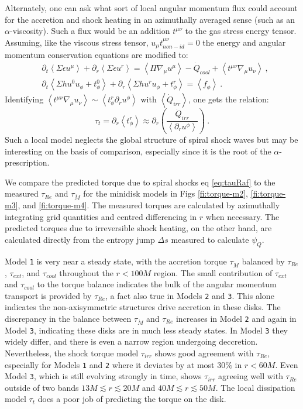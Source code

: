 \documentclass{emulateapj}
\newcommand{\al}{\alpha}
\newcommand{\De}{\Delta}
\newcommand{\eps}{\epsilon}
\newcommand{\Sig}{\Sigma}
\newcommand{\model}[1]{{Model \texttt{#1}}}
\newcommand{\ave}[1]{\left \langle #1 \right \rangle}
\begin{document}
Alternately, one can ask what sort of local angular momentum flux could account for the accretion and shock heating in an azimuthally averaged sense (such as an $\al$-viscosity).  Such a flux would be an addition $t^{\mu\nu}$ to the gas stress energy tensor.  Assuming, like the viscous stress tensor, $u_\mu t^{\mu\nu}_{non-id} = 0$ the energy and angular momentum conservation equations are modified to:
\begin{align}
	&\partial_t \ave{\Sig \eps u^\mu} + \partial_r \ave{\Sig \eps u^r} = \ave{\Pi \nabla_\mu u^\mu} - \dot{Q}_{cool} + \ave{t^{\mu\nu} \nabla_\mu u_\nu} \ ,\\
	&\partial_t \ave{\Sig h u^0 u_\phi + t^0_\phi} + \partial_r \ave{\Sig h u^r u_\phi + t^r_\phi} = \ave{f_\phi} \ .
\end{align}
Identifying $\ave{t^{\mu\nu} \nabla_\mu u_\nu} \sim \ave{t^r_\phi \partial_r u^\phi}$ with $\ave{\dot{Q}_{irr}}$, one gets the relation:
\begin{equation}
	\tau_{t} = \partial_r \ave{t^r_\phi} \approx \partial_r \left(\frac{\dot{Q}_{irr}}{\ave{\partial_r u^\phi}} \right)\ . \label{eq:tauLoc}
\end{equation}
Such a local model neglects the global structure of spiral shock waves but may be interesting on the basis of comparison,  especially since it is the root of the $\alpha$-prescription.

We compare the predicted torque due to spiral shocks eq \eqref{eq:tauRaf} to the measured $\tau_{Re}$ and $\tau_{\dot{M}}$ for the minidisk models in Figs \ref{fi:torque-m2}, \ref{fi:torque-m3}, and \ref{fi:torque-m4}.  The measured torques are calculated by azimuthally integrating grid quantities and centred differencing in $r$ when necessary.  The predicted torques due to irreversible shock heating, on the other hand, are calculated directly from the entropy jump $\De s$ measured to calculate $\psi_Q$.  

\model{1} is very near a steady state, with the accretion torque $\tau_{\dot{M}}$ balanced by $\tau_{Re}$, $\tau_{ext}$, and $\tau_{cool}$ throughout the $r < 100M$ region.  The small contribution of $\tau_{ext}$ and $\tau_{cool}$ to the torque balance indicates the bulk of the angular momentum transport is provided by $\tau_{Re}$, a fact also true in Models \texttt{2} and \texttt{3}.  This alone indicates the non-axisymmetric structures drive accretion in these disks.  The discrepancy in the balance between $\tau_{\dot{M}}$ and $\tau_{Re}$ increases in \model{2} and again in \model{3}, indicating these disks are in much less steady states.  In \model{3} they widely differ, and there is even a narrow region undergoing deccretion.  Nevertheless, the shock torque model $\tau_{irr}$ shows good agreement with $\tau_{Re}$, especially for Models \texttt{1} and \texttt{2} where it deviates by at most $30\%$ in $r < 60M$.  Even \model{3}, which is still evolving strongly in time, shows $\tau_{irr}$ agreeing well with $\tau_{Re}$ outside of two bands $13M \lesssim r \lesssim 20M$ and $40M \lesssim r \lesssim 50M$.  The local dissipation model $\tau_t$ does a poor job of predicting the torque on the disk.
\end{document}

